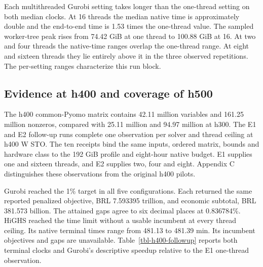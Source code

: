 \documentclass[
  english,
  11pt,
  a4paper,
  authoryear,
  preprint]{elsarticle}
\begin{document}
Each multithreaded Gurobi setting takes longer than the one-thread
setting on both median clocks. At 16 threads the median native time is
approximately double and the end-to-end time is 1.53 times the
one-thread value. The sampled worker-tree peak rises from 74.42 GiB at
one thread to 100.88 GiB at 16. At two and four threads the native-time
ranges overlap the one-thread range. At eight and sixteen threads they
lie entirely above it in the three observed repetitions. The per-setting
ranges characterize this run block.

\subsection{Evidence at h400 and coverage of
h500}\label{evidence-at-h400-and-coverage-of-h500}

The h400 common-Pyomo matrix contains 42.11 million variables and 161.25
million nonzeros, compared with 25.11 million and 94.97 million at h300.
The E1 and E2 follow-up runs complete one observation per solver and
thread ceiling at h400 W STO. The ten receipts bind the same inputs,
ordered matrix, bounds and hardware class to the 192 GiB profile and
eight-hour native budget. E1 supplies one and sixteen threads, and E2
supplies two, four and eight. Appendix C distinguishes these
observations from the original h400 pilots.

Gurobi reached the 1\% target in all five configurations. Each returned
the same reported penalized objective, BRL 7.593395 trillion, and
economic subtotal, BRL 381.573 billion. The attained gaps agree to six
decimal places at 0.836784\%. HiGHS reached the time limit without a
usable incumbent at every thread ceiling. Its native terminal times
range from 481.13 to 481.39 min. Its incumbent objectives and gaps are
unavailable. Table~\ref{tbl-h400-followup} reports both terminal clocks
and Gurobi's descriptive speedup relative to the E1 one-thread
observation.
\end{document}

